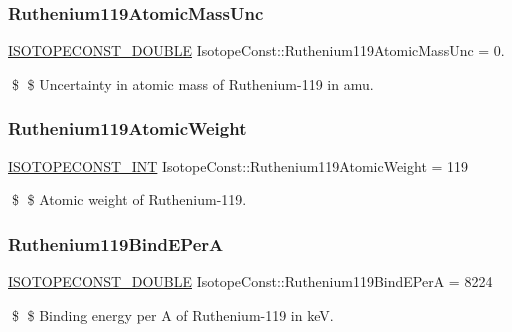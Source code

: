\subsubsection{\texorpdfstring{Ruthenium119\+Atomic\+Mass\+Unc}{Ruthenium119AtomicMassUnc}}
{\footnotesize\ttfamily \mbox{\hyperlink{group___isotope_const-_macros_ga8f45a7272ce02c0b4c65c44636ed719a}{I\+S\+O\+T\+O\+P\+E\+C\+O\+N\+S\+T\+\_\+\+D\+O\+U\+B\+LE}} Isotope\+Const\+::\+Ruthenium119\+Atomic\+Mass\+Unc = 0.}

\$ \$ Uncertainty in atomic mass of Ruthenium-\/119 in amu. \mbox{\label{group___isotope_const-_ruthenium-_ru119_ga08e00de6cc5b67d7e51a682d354ea8c8}} 
\subsubsection{\texorpdfstring{Ruthenium119\+Atomic\+Weight}{Ruthenium119AtomicWeight}}
{\footnotesize\ttfamily \mbox{\hyperlink{group___isotope_const-_macros_ga5f18360b3e99483a35c32d789e62621c}{I\+S\+O\+T\+O\+P\+E\+C\+O\+N\+S\+T\+\_\+\+I\+NT}} Isotope\+Const\+::\+Ruthenium119\+Atomic\+Weight = 119}

\$ \$ Atomic weight of Ruthenium-\/119. \mbox{\label{group___isotope_const-_ruthenium-_ru119_ga4e49ea24738934787de81070d8d3dcdf}} 
\subsubsection{\texorpdfstring{Ruthenium119\+Bind\+E\+PerA}{Ruthenium119BindEPerA}}
{\footnotesize\ttfamily \mbox{\hyperlink{group___isotope_const-_macros_ga8f45a7272ce02c0b4c65c44636ed719a}{I\+S\+O\+T\+O\+P\+E\+C\+O\+N\+S\+T\+\_\+\+D\+O\+U\+B\+LE}} Isotope\+Const\+::\+Ruthenium119\+Bind\+E\+PerA = 8224}

\$ \$ Binding energy per A of Ruthenium-\/119 in keV. \mbox{\label{group___isotope_const-_ruthenium-_ru119_ga3652ac0c55451bceb231a13fefc3c998}} 
